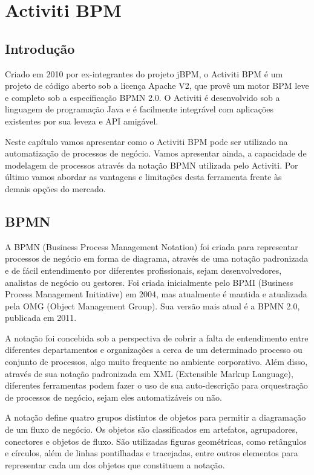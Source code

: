 \chapter{Activiti BPM}\label{chp:activiti}

\section{Introdução}\label{sec:activiti-introducao}
Criado em 2010 por ex-integrantes do projeto jBPM, o Activiti BPM é um projeto de código aberto sob a licença Apache V2, que provê um motor BPM leve e completo sob a especificação BPMN 2.0. O Activiti é desenvolvido sob a linguagem de programação Java e é facilmente integrável com aplicações existentes por sua leveza e API amigável.

Neste capítulo vamos apresentar como o Activiti BPM pode ser utilizado na automatização de processos de negócio. Vamos apresentar ainda, a capacidade de modelagem de processos através da notação BPMN utilizada pelo Activiti. Por último vamos abordar as vantagens e limitações desta ferramenta frente às demais opções do mercado.

\section{BPMN}\label{sec:activiti-bpmn}
A BPMN (Business Process Management Notation) foi criada para representar processos de negócio em forma de diagrama, através de uma notação padronizada e de fácil entendimento por diferentes profissionais, sejam desenvolvedores, analistas de negócio ou gestores. Foi criada inicialmente pelo BPMI (Business Process Management Initiative) em 2004, mas atualmente é mantida e atualizada pela OMG (Object Management Group). Sua versão mais atual é a BPMN 2.0, publicada em 2011.

A notação foi concebida sob a perspectiva de cobrir a falta de entendimento entre diferentes departamentos e organizações a cerca de um determinado processo ou conjunto de processos, algo muito frequente no ambiente corporativo. Além disso, através de sua notação padronizada em XML (Extensible Markup Language), diferentes ferramentas podem fazer o uso de sua auto-descrição para orquestração de processos de negócio, sejam eles automatizáveis ou não.

A notação define quatro grupos distintos de objetos para permitir a diagramação de um fluxo de negócio. Os objetos são classificados em artefatos, agrupadores, conectores e objetos de fluxo. São utilizadas figuras geométricas, como retângulos e círculos, além de linhas pontilhadas e tracejadas, entre outros elementos para representar cada um dos objetos que constituem a notação.

